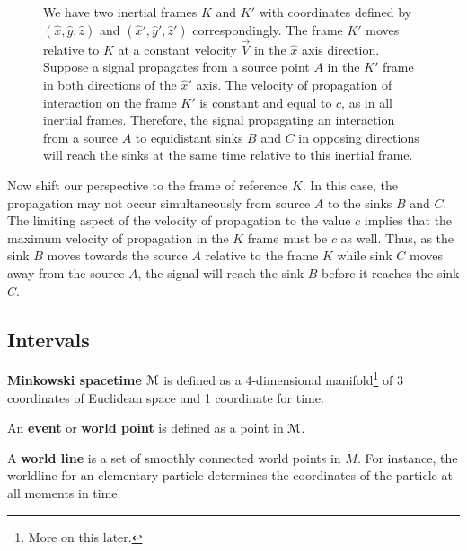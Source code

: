 \documentclass{article}
\begin{document}
\begin{exmp}
\begin{figure}[h]
\begin{subfigure}{0.4\textwidth}
\begin{tikzpicture}[scale=1]
						\end{tikzpicture}
					\end{subfigure}
					\hfill
					\begin{minipage}{0.56\columnwidth}
						\begin{spacing}{1.5}
							We have two inertial frames $K$ and $K'$ with coordinates defined by $(\hat{x},\hat{y},\hat{z})$ and $(\hat{x}',\hat{y}',\hat{z}')$ correspondingly. The frame $K'$ moves relative to $K$ at a constant velocity $\vec{V}$ in the $\hat{x}$ axis direction. Suppose a signal propagates from a source point $A$ in the $K'$ frame in both directions of the $\hat{x}'$ axis. The velocity of propagation of interaction on the frame $K'$ is constant and equal to $c$, as in all inertial frames. Therefore, the signal propagating an interaction from a source $A$ to equidistant sinks $B$ and $C$ in opposing directions will reach the sinks at the same time relative to this inertial frame.
						\end{spacing}
					\end{minipage}
				\end{figure}
				
				Now shift our perspective to the frame of reference $K$. In this case, the propagation may not occur simultaneously from source $A$ to the sinks $B$ and $C$. The limiting aspect of the velocity of propagation to the value $c$ implies that the maximum velocity of propagation in the $K$ frame must be $c$ as well. Thus, as the sink $B$ moves towards the source $A$ relative to the frame $K$ while sink $C$ moves away from the source $A$, the signal will reach the sink $B$ before it reaches the sink $C$.
			
			\end{exmp}
		\subsection{Intervals}
			\begin{defn}
				\textbf{Minkowski spacetime} $\M$ is defined as a 4-dimensional manifold\footnote{More on this later.} of 3 coordinates of Euclidean space and 1 coordinate for time.
			\end{defn}
			\begin{defn}
				An \textbf{event} or \textbf{world point} is defined as a point in $\M$. 
			\end{defn}
			\begin{defn}
				A \textbf{world line} is a set of smoothly connected world points in $M$. For instance, the worldline for an elementary particle determines the coordinates of the particle at all moments in time.
			\end{defn}
			
\end{document}
